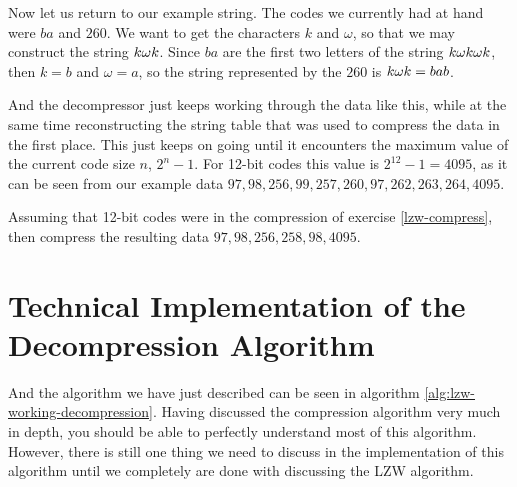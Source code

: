 Now let us return to our example string. The codes we currently had at
hand were $ba$ and $260$. We want to get the characters $k$ and
$\omega$, so that we may construct the string $k\omega k$. Since $ba$ are
the first two letters of the string $k\omega k \omega k$, then $k = b$ and $\omega
= a$, so the string represented by the $260$ is $k\omega k = bab$.

And the decompressor just keeps working through the data like this,
while at the same time reconstructing the string table that was used
to compress the data in the first place. This just keeps on going
until it encounters the maximum value of the current code size $n$,
$2^{n}-1$. For 12-bit codes this value is $2^{12} - 1 = 4095$, as it
can be seen from our example data $97, 98, 256, 99, 257, 260, 97, 262,
263, 264, 4095$.

\begin{Exercise}[label={lzw-decompress}]

  Assuming that 12-bit codes were in the compression of exercise
  \ref{lzw-compress}, then compress the resulting data
  $97,98,256,258,98,4095$.

\end{Exercise}

\section{Technical Implementation of the Decompression Algorithm}

And the algorithm we have just described can be seen in algorithm
\ref{alg:lzw-working-decompression}. Having discussed the compression
algorithm very much in depth, you should be able to perfectly
understand most of this algorithm. However, there is still one thing
we need to discuss in the implementation of this algorithm until we
completely are done with discussing the LZW algorithm.

